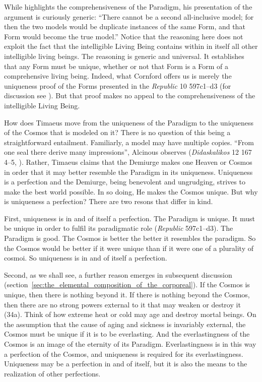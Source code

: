 While \citet[42--3]{Cornford:1935fk} highlights the comprehensiveness of the Paradigm, his presentation of the argument is curiously generic: ``There cannot be a second all-inclusive model; for then the two models would be duplicate instances of the same Form, and that Form would become the true model.'' Notice that the reasoning here does not exploit the fact that the intelligible Living Being contains within in itself all other intelligible living beings. The reasoning is generic and universal. It establishes that any Form must be unique, whether or not that Form is a Form of a comprehensive living being. Indeed, what Cornford offers us is merely the uniqueness proof of the Forms presented in the \emph{Republic} 10 597c1--d3 (for discussion see \citealt{Parry:1985tx}). But that proof makes no appeal to the comprehensiveness of the intelligible Living Being.

How does Timaeus move from the uniqueness of the Paradigm to the uniqueness of the Cosmos that is modeled on it? There is no question of this being a straightforward entailment. Familiarly, a model may have multiple copies. ``From one seal there derive many impressions'', Alcinous observes (\emph{Didaskalikos} 12 167 4--5, \citealt[20]{Dillon:2002aa}). Rather, Timaeus claims that the Demiurge makes one Heaven or Cosmos in order that it may better resemble the Paradigm in its uniqueness. Uniqueness is a perfection and the Demiurge, being benevolent and ungrudging, strives to make the best world possible. In so doing, He makes the Cosmos unique. But why is uniqueness a perfection? There are two resons that differ in kind.

First, uniqueness is in and of itself a perfection. The Paradigm is unique. It must be unique in order to fulfil its paradigmatic role (\emph{Republic} 597c1--d3). The Paradigm is good. The Cosmos is better the better it resembles the paradigm. So the Cosmos would be better if it were unique than if it were one of a plurality of cosmoi. So uniqueness is in and of itself a perfection. 

Second, as we shall see, a further reason emerges in subsequent discussion (section~\ref{sec:the_elemental_composition_of_the_corporeal}). If the Cosmos is unique, then there is nothing beyond it. If there is nothing beyond the Cosmos, then there are no strong powers external to it that may weaken or destroy it (34a). Think of how extreme heat or cold may age and destroy mortal beings. On the assumption that the cause of aging and sickness is invariably external, the Cosmos must be unique if it is to be everlasting. And the everlastingness of the Cosmos is an image of the eternity of its Paradigm. Everlastingness is in this way a perfection of the Cosmos, and uniqueness is required for its everlastingness. Uniqueness may be a perfection in and of itself, but it is also the means to the realization of other perfections.

